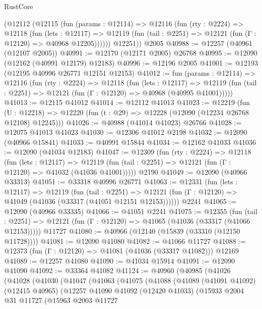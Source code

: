 \begin{lexlean}{RustCore}
\begin{coremodule}
      (@12112
        (@12115
          (fun (params : @12114) =>
          @12116
            (fun (rty : @2224) =>
            @12118
              (fun (lets : @12117) =>
              @12119 (fun (tail : @2251) => @12121 (fun (Γ : @12120) => @40968 @12205))))))
        @12251))
    @2005
@40988 := @12257 (@40961 (@12107 @2005))
@40991 := @12170 (@12171 @2005) @26768
@40995 := @12090 (@12162 (@40991 @12179) @12183)
@40996 := @12196 @2005
@41001 := @12193 (@12195 @40996 @26771 @12151 @12153)
@41012 := fun (params : @12114) =>
  @12116
    (fun (rty : @2224) =>
    @12118
      (fun (lets : @12117) =>
      @12119 (fun (tail : @2251) => @12121 (fun (Γ : @12120) => @40968 (@40995 @41001)))))
@41013 := @12115 @41012
@41014 := @12112 @41013
@41023 := @12219
    (fun (U : @12218) => @12220 (fun (t : @29) => @12228 (@12090 (@12234 @26768 @12108) @12245)))
@41026 := @40988 (@41014 @41023) @26766
@41028 := @12075 @41013 @41023
@41030 := @12306 @41012 @2198
@41032 := @12090 (@40966 @15841)
@41033 := @40991 @15844
@41034 := @12162 @41033
@41036 := @12090 (@41034 @12183)
@41047 := @12309
    (fun (rty : @2224) =>
    @12118
      (fun (lets : @12117) =>
      @12119 (fun (tail : @2251) => @12121 (fun (Γ : @12120) => @41032 (@41036 @41001)))))
    @2190
@41049 := @12090 (@40966 @33313)
@41051 := @33318 @40996 @26771
@41063 := @12331
    (fun (lets : @12117) =>
    @12119
      (fun (tail : @2251) =>
      @12121 (fun (Γ : @12120) => @41049 (@41036 (@33317 (@41051 @12151 @12153))))))
    @2241
@41065 := @12090 (@40966 @33335)
@41066 := @41051 @2241
@41075 := @12355
    (fun (tail : @2251) => @12121 (fun (Γ : @12120) => @41065 (@41036 (@33317 (@41066 @12153)))))
    @11727
@41080 := @40966 (@12140 (@15839 (@33310 (@12150 @11728))))
@41081 := @12090 @41080
@41082 := @41066 @11727
@41088 := @12373 (fun (Γ : @12120) => @41081 (@41036 (@33317 @41082))) @12169
@41089 := @12257 @41080
@41090 := @41034 @15914
@41091 := @12090 @41090
@41092 := @33364 @41082
@41124 := @40960
    (@40985
      (@41026
        (@41028
          (@41030
            (@41047
              (@41063
                (@41075
                  (@41088
                    (@41089
                      (@41091 @41092)
                      (@12415 @40965)
                      (@12257
                        @41090
                        @41092
                        (@12420 @41033)
                        (@15933
                          @2004
                          @31
                          @11727
                          (@15963
                            @2003
                            @11727

\end{coremodule}
\end{lexlean}
